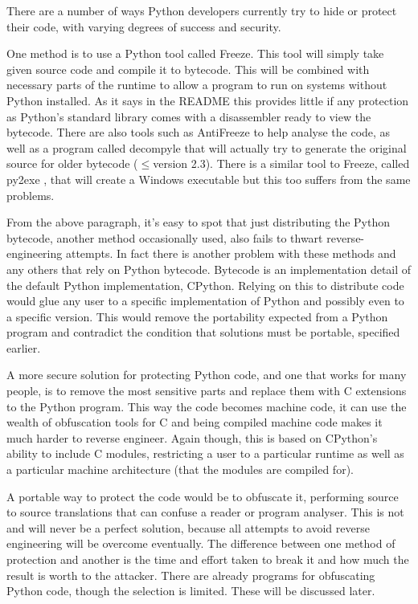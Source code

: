 \documentclass{report}
\begin{document}
There are a number of ways Python developers currently try to hide or protect their code, with varying degrees
of success and security.

One method is to use a Python tool called Freeze. This tool will simply take given source code and compile
it to bytecode. This will be combined with necessary parts of the runtime to allow a program to run
on systems without Python installed. As it says in the README \cite{freezereadme} this provides little if any
protection as Python's standard library comes with a disassembler ready to view the bytecode. There are also
tools such as AntiFreeze \cite{pirates} to help analyse the code, as well as a program called
decompyle \cite{decompyle} that will actually try to generate the original source for older bytecode ($\le$version
2.3). There is a similar tool to Freeze, called py2exe \cite{py2exe}, that will create a Windows executable but
this too suffers from the same problems.

From the above paragraph, it's easy to spot that just distributing the Python bytecode, another method occasionally
used, also fails to thwart reverse-engineering attempts. In fact there is another problem
with these methods and any others that rely on Python bytecode. Bytecode is an implementation detail \cite{dis}
of the default Python implementation, CPython. Relying on this to distribute code would glue any
user to a specific implementation of Python and possibly even to a specific version. This would remove the portability
expected from a Python program and contradict the condition that solutions must be portable, specified earlier.

A more secure solution for protecting Python code, and one that works for many people, is to remove the most
sensitive parts and replace them with C extensions to the Python program. This way the code becomes machine
code, it can use the wealth of obfuscation tools for C and being compiled machine code makes it much
harder to reverse engineer. Again though, this is based on CPython's ability to include C modules, restricting a
user to a particular runtime as well as a particular machine architecture (that the modules are compiled for).

A portable way to protect the code would be to obfuscate it, performing source to source translations that can
confuse a reader or program analyser. This is not and will never be a perfect solution, because all attempts
to avoid reverse engineering will be overcome eventually. The difference between one method of protection and
another is the time and effort taken to break it and how much the result is worth to the attacker. There are already
programs for obfuscating Python code, though the selection is limited. These will be discussed later.
\end{document}
